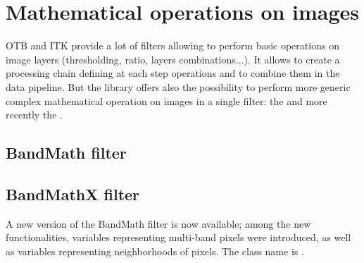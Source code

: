 





\section{Mathematical operations on images}
OTB and ITK provide a lot of filters allowing to perform basic operations on image layers (thresholding, ratio, layers combinations...).
It allows to create a processing chain defining at each step operations and to combine them in the data pipeline.
But the library offers also the possibility to perform more generic complex mathematical operation on images in a single filter: the
 and more recently the .

\subsection{BandMath filter}
\label{sec:BandMathImageFilter}

\ifitkFullVersion

\fi

\subsection{BandMathX filter}
\label{sec:BandMathImageFilterX}
A new version of the BandMath filter is now available; among the new functionalities, variables representing multi-band pixels were introduced, as well as variables representing neighborhoods of pixels. The class name is .

